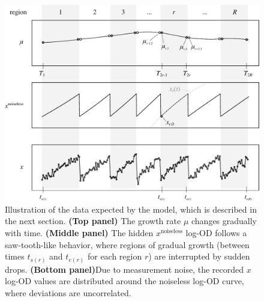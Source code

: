 \newpage
\begin{figure}[h]
\centering
\includegraphics[width=\textwidth]{figs/data.pdf}
\caption{
	\label{fig:data}
	Illustration of the data expected by the model, which is described in the next section. {\bf (Top panel)} The growth rate $\mu$ changes gradually with time. {\bf (Middle panel)} The hidden $x^\text{noiseless}$ log-OD follows a saw-tooth-like behavior, where regions of gradual growth (between times $t_{s(r)}$ and $t_{e(r)}$ for each region $r$) are interrupted by sudden drops. {\bf (Bottom panel)}Due to measurement noise, the recorded $x$ log-OD values are distributed around the noiseless log-OD curve, where deviations are uncorrelated.
}
\end{figure}
\newpage
